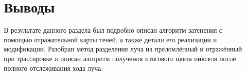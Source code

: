 \section*{Выводы}
В результате данного раздела был подробно описан алгоритм затенения с помощью
отражательной карты теней, а также детали его реализации и модификации.
Разобран метод разделения луча на преломлённый и отражённый
при трассировке и описан алгоритм получения итогового цвета пикселя
после полного отслеживания хода луча.

